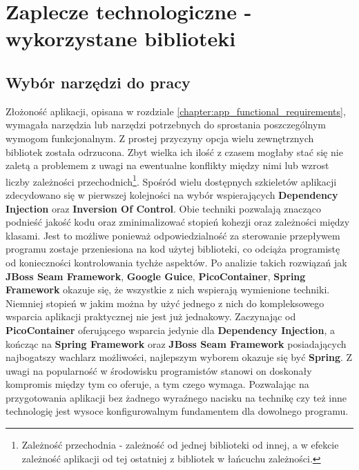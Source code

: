 \chapter{Zaplecze technologiczne - wykorzystane biblioteki}
\label{chapter:libs}

\section{Wybór narzędzi do pracy}
	Złożoność aplikacji, opisana w rozdziale \ref{chapter:app_functional_requirements}, wymagała narzędzia lub narzędzi potrzebnych do sprostania poszczególnym wymogom funkcjonalnym. Z prostej przyczyny opcja wielu zewnętrznych bibliotek została odrzucona. Zbyt wielka ich ilość z czasem mogłaby stać się nie zaletą a problemem z uwagi na ewentualne konflikty między nimi lub wzrost liczby zależności przechodnich\footnote{Zależność przechodnia - zależność od jednej biblioteki od innej, a w efekcie zależność aplikacji od tej ostatniej z bibliotek w łańcuchu zależności.}. Spośród wielu dostępnych szkieletów aplikacji zdecydowano się w pierwszej kolejności na wybór wspierających \textbf{Dependency Injection} oraz \textbf{Inversion Of Control}. Obie techniki pozwalają znacząco podnieść jakość kodu oraz zminimalizować stopień kohezji oraz zależności między klasami. Jest to możliwe ponieważ odpowiedzialność za sterowanie przepływem programu zostaje przeniesiona na kod użytej biblioteki, co odciąża programistę od konieczności kontrolowania tychże aspektów. Po analizie takich rozwiązań jak \textbf{JBoss Seam Framework}, \textbf{Google Guice}, \textbf{PicoContainer}, \textbf{Spring Framework} okazuje się, że wszystkie z nich wspierają wymienione techniki. Niemniej stopień w jakim można by użyć jednego z nich do kompleksowego wsparcia aplikacji praktycznej nie jest już jednakowy. Zaczynając od \textbf{PicoContainer} oferującego wsparcia jedynie dla \textbf{Dependency Injection}, a kończąc na \textbf{Spring Framework} oraz \textbf{JBoss Seam Framework} posiadających najbogatszy wachlarz możliwości, najlepszym wyborem okazuje się być \textbf{Spring}. Z uwagi na popularność w środowisku programistów stanowi on doskonały kompromis między tym co oferuje, a tym czego wymaga. Pozwalając na przygotowania aplikacji bez żadnego wyraźnego nacisku na technikę czy też inne technologię jest wysoce konfigurowalnym fundamentem dla dowolnego programu. 
	
